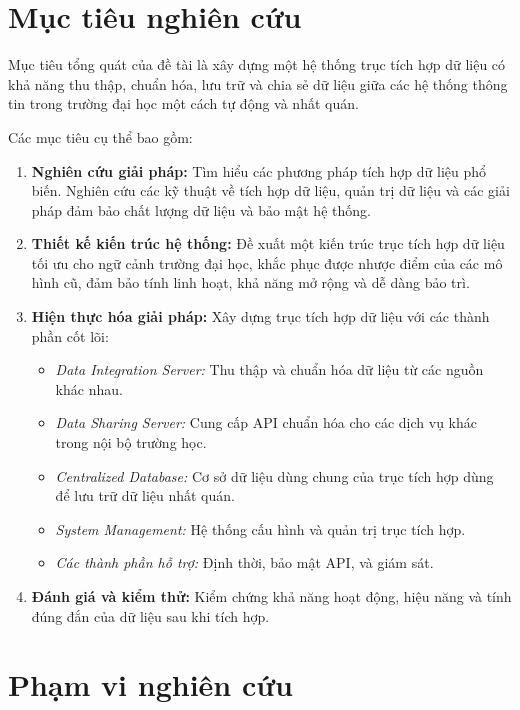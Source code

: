 \section{Mục tiêu nghiên cứu}

Mục tiêu tổng quát của đề tài là xây dựng một hệ thống trục tích hợp dữ liệu có khả năng thu thập, chuẩn hóa, lưu trữ và chia sẻ dữ liệu giữa các hệ thống thông tin trong trường đại học một cách tự động và nhất quán.

Các mục tiêu cụ thể bao gồm:

\begin{enumerate}
    \item \textbf{Nghiên cứu giải pháp:} Tìm hiểu các phương pháp tích hợp dữ liệu phổ biến. Nghiên cứu các kỹ thuật về tích hợp dữ liệu, quản trị dữ liệu và các giải pháp đảm bảo chất lượng dữ liệu và bảo mật hệ thống.
    \item \textbf{Thiết kế kiến trúc hệ thống:} Đề xuất một kiến trúc trục tích hợp dữ liệu tối ưu cho ngữ cảnh trường đại học, khắc phục được nhược điểm của các mô hình cũ, đảm bảo tính linh hoạt, khả năng mở rộng và dễ dàng bảo trì.
    \item \textbf{Hiện thực hóa giải pháp:} Xây dựng trục tích hợp dữ liệu với các thành phần cốt lõi:
    \begin{itemize}
        \item \textit{Data Integration Server:} Thu thập và chuẩn hóa dữ liệu từ các nguồn khác nhau.
        \item \textit{Data Sharing Server:} Cung cấp API chuẩn hóa cho các dịch vụ khác trong nội bộ trường học.
        \item \textit{Centralized Database:} Cơ sở dữ liệu dùng chung của trục tích hợp dùng để lưu trữ dữ liệu nhất quán.
        \item \textit{System Management:} Hệ thống cấu hình và quản trị trục tích hợp.
        \item \textit{Các thành phần hỗ trợ:} Định thời, bảo mật API, và giám sát.
    \end{itemize}
    \item \textbf{Đánh giá và kiểm thử:} Kiểm chứng khả năng hoạt động, hiệu năng và tính đúng đắn của dữ liệu sau khi tích hợp.
\end{enumerate}

\section{Phạm vi nghiên cứu}

